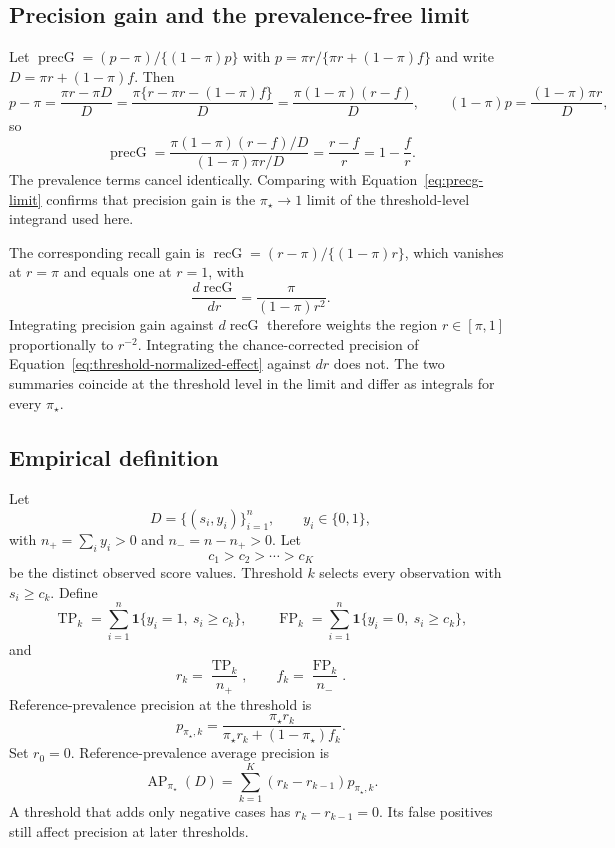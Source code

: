 \documentclass[11pt]{article}
\newcommand{\AP}{\operatorname{AP}}
\theoremstyle{remark}
\begin{document}
\subsection{Precision gain and the prevalence-free limit}
\label{app:precg}

Let $\operatorname{precG}=(p-\pi)/\{(1-\pi)p\}$ with $p=\pi r/\{\pi r+(1-\pi)f\}$ and write $D=\pi r+(1-\pi)f$. Then
\[
p-\pi
=
\frac{\pi r-\pi D}{D}
=
\frac{\pi\{r-\pi r-(1-\pi)f\}}{D}
=
\frac{\pi(1-\pi)(r-f)}{D},
\qquad
(1-\pi)p
=
\frac{(1-\pi)\pi r}{D},
\]
so
\[
\operatorname{precG}
=
\frac{\pi(1-\pi)(r-f)/D}{(1-\pi)\pi r/D}
=
\frac{r-f}{r}
=
1-\frac{f}{r}.
\]
The prevalence terms cancel identically. Comparing with Equation~\eqref{eq:precg-limit} confirms that precision gain is the $\pi_\star\to1$ limit of the threshold-level integrand used here.

The corresponding recall gain is $\operatorname{recG}=(r-\pi)/\{(1-\pi)r\}$, which vanishes at $r=\pi$ and equals one at $r=1$, with
\[
\frac{d\operatorname{recG}}{dr}
=
\frac{\pi}{(1-\pi)r^{2}} .
\]
Integrating precision gain against $d\operatorname{recG}$ therefore weights the region $r\in[\pi,1]$ proportionally to $r^{-2}$. Integrating the chance-corrected precision of Equation~\eqref{eq:threshold-normalized-effect} against $dr$ does not. The two summaries coincide at the threshold level in the limit and differ as integrals for every $\pi_\star$.

\subsection{Empirical definition}

Let
\[
D=\{(s_i,y_i)\}_{i=1}^{n},
\qquad y_i\in\{0,1\},
\]
with $n_+=\sum_i y_i>0$ and $n_-=n-n_+>0$. Let
\[
c_1>c_2>\cdots>c_K
\]
be the distinct observed score values. Threshold $k$ selects every observation with $s_i\geq c_k$. Define
\[
\operatorname{TP}_k
=
\sum_{i=1}^{n}\mathbf{1}\{y_i=1,\ s_i\geq c_k\},
\qquad
\operatorname{FP}_k
=
\sum_{i=1}^{n}\mathbf{1}\{y_i=0,\ s_i\geq c_k\},
\]
and
\[
r_k=\frac{\operatorname{TP}_k}{n_+},
\qquad
f_k=\frac{\operatorname{FP}_k}{n_-}.
\]
Reference-prevalence precision at the threshold is
\begin{equation}
p_{\pi_\star,k}
=
\frac{\pi_\star r_k}
{\pi_\star r_k+(1-\pi_\star)f_k}.
\label{eq:empirical-reference-precision}
\end{equation}
Set $r_0=0$. Reference-prevalence average precision is
\begin{equation}
\AP_{\pi_\star}(D)
=
\sum_{k=1}^{K}
(r_k-r_{k-1})p_{\pi_\star,k}.
\label{eq:standardized-ap}
\end{equation}
A threshold that adds only negative cases has $r_k-r_{k-1}=0$. Its false positives still affect precision at later thresholds.
\end{document}
